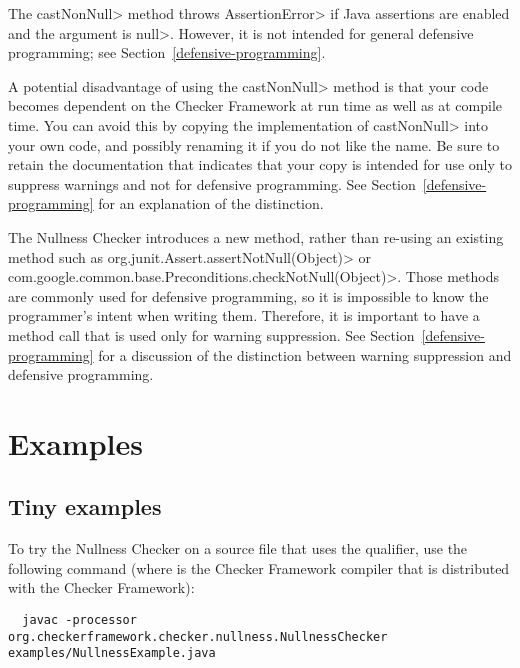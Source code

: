   The \<castNonNull> method throws \<AssertionError> if Java assertions are enabled and
  the argument is \<null>.  However, it is not intended for general defensive
  programming; see Section~\ref{defensive-programming}.

  A potential disadvantage of using the \<castNonNull> method is that your
  code becomes dependent on the Checker Framework at run time as well as at
  compile time.  You can avoid this by copying the implementation of
  \<castNonNull> into your own code, and possibly renaming it if you do not
  like the name.  Be sure to retain the documentation that indicates that
  your copy is intended for use only to suppress warnings and not for
  defensive programming.  See Section~\ref{defensive-programming} for an
  explanation of the distinction.

\begin{sloppypar}
The Nullness Checker introduces a new method, rather than re-using an
existing method such as \<org.junit.Assert.assertNotNull(Object)> or
\<com.google.common.base.Preconditions.checkNotNull(Object)>.  Those
methods are commonly used for defensive programming, so it is impossible to
know the programmer's intent when writing them.  Therefore, it is important to
have a method call that is used only for warning suppression.  See
Section~\ref{defensive-programming} for a discussion of
the distinction between warning suppression and defensive programming.
\end{sloppypar}


\section{Examples\label{nullness-example}}

\subsection{Tiny examples\label{nullness-tiny-examples}}

To try the Nullness Checker on a source file that uses the  qualifier,
use the following command (where  is the Checker Framework compiler that
is distributed with the Checker Framework):

\begin{smaller}
\begin{Verbatim}
  javac -processor org.checkerframework.checker.nullness.NullnessChecker examples/NullnessExample.java
\end{Verbatim}
\end{smaller}

